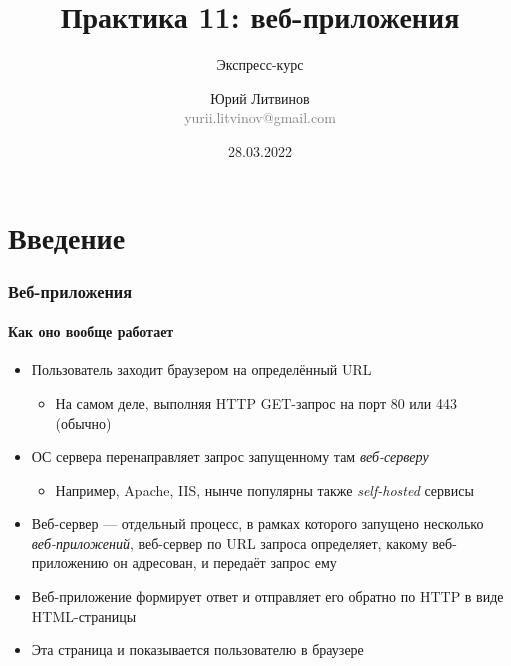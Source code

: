 \documentclass[xetex,mathserif,serif]{beamer}
\title{Практика 11: веб-приложения}
\subtitle{Экспресс-курс}
\author[Юрий Литвинов]{Юрий Литвинов\\\small{\textcolor{gray}{yurii.litvinov@gmail.com}}}
\date{28.03.2022}
\begin{document}
    \frame{\titlepage}

    \section{Введение}

    \begin{frame}
        \frametitle{Веб-приложения}
        \framesubtitle{Как оно вообще работает}
        \begin{itemize}
            \item Пользователь заходит браузером на определённый URL
            \begin{itemize}
                \item На самом деле, выполняя HTTP GET-запрос на порт 80 или 443 (обычно)
            \end{itemize}
            \item ОС сервера перенаправляет запрос запущенному там \emph{веб-серверу}
            \begin{itemize}
                \item Например, Apache, IIS, нынче популярны также \emph{self-hosted} сервисы
            \end{itemize}
            \item Веб-сервер --- отдельный процесс, в рамках которого запущено несколько \emph{веб-приложений}, веб-сервер по URL запроса определяет, какому веб-приложению он адресован, и передаёт запрос ему
            \item Веб-приложение формирует ответ и отправляет его обратно по HTTP в виде HTML-страницы
            \item Эта страница и показывается пользователю в браузере
        \end{itemize}
    \end{frame}
\end{document}
